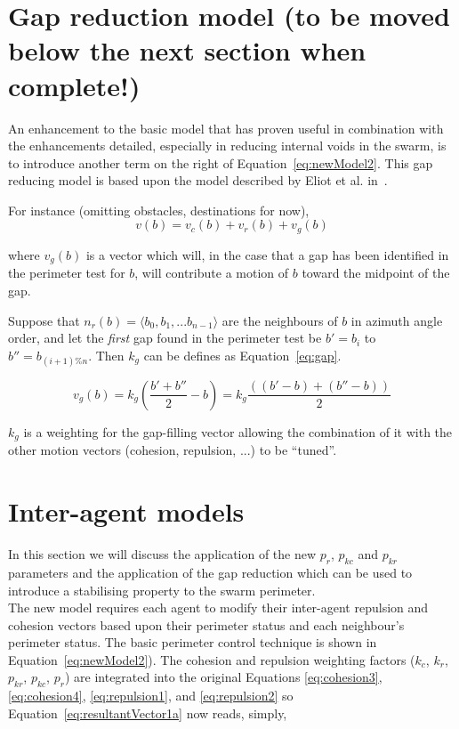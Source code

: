 \documentclass[12pt,a4paper]{IEEEtran}
\newcommand{\vbb}[2]{#2-#1}
\begin{document}
\section{Gap reduction model (to be moved below the next section when complete!)}
An enhancement to the basic model that has proven useful in combination with the enhancements detailed, especially in reducing internal voids in the swarm, is to introduce another term on the right of Equation~\ref{eq:newModel2}. This gap reducing model is based upon the model described by Eliot et al. in~\cite{eliot2019void}.

For instance (omitting obstacles, destinations for now),
\begin{equation}\label{eq:newModel3}
v(b) = v_c(b) + v_r(b) + v_g(b)
\end{equation}

where $v_g(b)$ is a vector which will, in the case that a gap has been identified in the perimeter test for $b$, will contribute a motion of $b$ toward the midpoint of the gap.

Suppose that $n_r(b) = \langle b_0, b_1, ... b_{n-1}\rangle$ are the neighbours of $b$ in azimuth angle order, and let the \emph{first} gap found in the perimeter test be $b' = b_i$ to $b'' = b_{(i+1)\%n}$. Then $k_g$ can be defines as Equation~\ref{eq:gap}. 

\small\begin{equation}\label{eq:gap}
v_g(b) = k_g \left(\frac{b' + b''}{2} - b \right) = k_g \frac{\left(\left(\vbb{b}{b'}\right) + \left(\vbb{b}{b''}\right)\right)}{2} 
\end{equation}\normalsize

$k_g$ is a weighting for the gap-filling vector allowing the combination of it with the other motion vectors (cohesion, repulsion, ...) to be ``tuned''.

\section{Inter-agent models}
In this section we will discuss the application of the new $p_r$, $p_{kc}$ and $p_{kr}$ parameters and the application of the gap reduction which can be used to introduce a stabilising property to the swarm perimeter.\\
The new model requires each agent to modify their inter-agent repulsion and cohesion vectors based upon their perimeter status and each neighbour's perimeter status. The basic perimeter control technique is shown in Equation~\ref{eq:newModel2}). The cohesion and repulsion weighting factors ($k_c$, $k_r$, $p_{kr}$, $p_{kc}$, $p_r$) are integrated into the original Equations \ref{eq:cohesion3}, \ref{eq:cohesion4}, \ref{eq:repulsion1}, and \ref{eq:repulsion2} so Equation~\ref{eq:resultantVector1a} now reads, simply,
\end{document}
